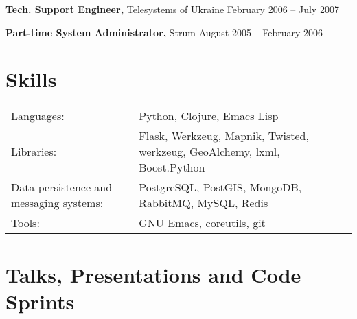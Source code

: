 \documentclass[margin]{res}
\begin{document}
\begin{resume}
{\bf Tech. Support Engineer,} Telesystems of Ukraine \hfill February 2006 -- July 2007




{\bf Part-time System Administrator,} Strum \hfill August 2005 -- February 2006



\section{Skills}
\begin{tabular}{l p{3in}}
  Languages: & Python, Clojure, Emacs Lisp \\
  Libraries: & Flask, Werkzeug, Mapnik, Twisted, werkzeug, GeoAlchemy, lxml, Boost.Python \\
  Data persistence and messaging systems: & PostgreSQL, PostGIS, MongoDB, RabbitMQ, MySQL, Redis \\
  Tools: & GNU Emacs, coreutils, git
\end{tabular}

\section{Talks, Presentations and Code Sprints}


\end{resume}
\end{document}
